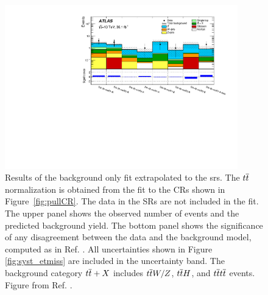 \begin{figure}[htbp]
	\centering
	\includegraphics[width=0.9\textwidth]{figures/ewk_prod/etmiss_results/histpull_pulls_in_SR_qcdStrong}
	\caption{Results of the background only fit extrapolated to the \glspl{sr}. 
	The $t\overline{t}$ normalization is obtained from the fit to the CRs shown in Figure~\ref{fig:pullCR}. The data in the  SRs are 
	not included in the fit.  The upper panel shows the observed number of events and the predicted background 
	yield.  The bottom panel shows the significance of any disagreement between the data and the background model, computed as in Ref. \cite{Choudalakis:2011okv}. All uncertainties  shown in Figure \ref{fig:syst_etmiss} are included in the uncertainty band. 
	The background
	category $t\overline{t}+X$ includes $t\overline{t} W/Z$, $t\overline{t} H$, and $t\overline{t} t\overline{t}$ events. Figure from Ref. \cite{Aaboud:2018htj}.} 
	\label{fig:ewk:pullSR}
\end{figure}

